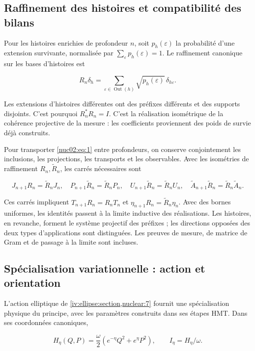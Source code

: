 \subsection{Raffinement des histoires et compatibilité des bilans}

Pour les histoires enrichies de profondeur \(n\), soit \(p_h(\varepsilon)\) la probabilité d’une extension survivante, normalisée par \(\sum_\varepsilon p_h(\varepsilon)=1\). Le raffinement canonique sur les bases d’histoires est


\[
R_n\delta_h=\sum_{\varepsilon\in\operatorname{Out}(h)}
\sqrt{p_h(\varepsilon)}\,\delta_{h\varepsilon}.
\]

Les extensions d’histoires différentes ont des préfixes différents et des supports disjoints. C’est pourquoi \(R_n^*R_n=I\). C’est la réalisation isométrique de la cohérence projective de la mesure : les coefficients proviennent des poids de survie déjà construits.

Pour transporter \eqref{nuc02:eq:1} entre profondeurs, on conserve conjointement les inclusions, les projections, les transports et les observables. Avec les isométries de raffinement \(R_n,\widetilde R_n\), les carrés nécessaires sont


\[
J_{n+1}R_n=\widetilde R_nJ_n,\quad
P_{n+1}\widetilde R_n=\widetilde R_nP_n,\quad
U_{n+1}\widetilde R_n=\widetilde R_nU_n,\quad
\widetilde A_{n+1}\widetilde R_n=\widetilde R_n\widetilde A_n.
\]

Ces carrés impliquent \(T_{n+1}R_n=R_nT_n\) et \(\eta_{n+1}R_n=\widetilde R_n\eta_n\). Avec des bornes uniformes, les identités passent à la limite inductive des réalisations. Les histoires, en revanche, forment le système projectif des préfixes ; les directions opposées des deux types d’applications sont distinguées. Les preuves de mesure, de matrice de Gram et de passage à la limite sont incluses.

\subsection{Spécialisation variationnelle : action et orientation}

L’action elliptique de \cref{iv:ellipse:section,nuclear:7} fournit une spécialisation physique du principe, avec les paramètres construits dans ses étapes HMT. Dans ses coordonnées canoniques,


\[
H_\eta(Q,P)=\frac{\omega}{2}
\left(e^{-\eta}Q^2+e^\eta P^2\right),\qquad
I_\eta=H_\eta/\omega.
\]

